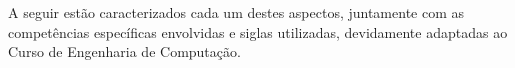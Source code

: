 A seguir estão caracterizados cada um destes aspectos, juntamente com as competências específicas envolvidas e siglas utilizadas, devidamente adaptadas ao Curso de Engenharia de Computação.


%







